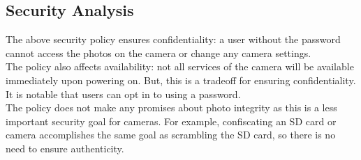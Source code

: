 \documentclass{article}
\begin{document}
\begin{homeworkProblem}[1]
      \section{Security Analysis}
        The above security policy ensures confidentiality: a user without the password cannot access the photos on the camera or change any camera settings. \\

        The policy also affects availability: not all services of the camera will be available immediately upon powering on. But, this is a tradeoff for ensuring confidentiality. It is notable that users can opt in to using a password. \\

        The policy does not make any promises about photo integrity as this is a less important security goal for cameras. For example, confiscating an SD card or camera accomplishes the same goal as scrambling the SD card, so there is no need to ensure authenticity.
  \end{homeworkProblem}
\end{document}
